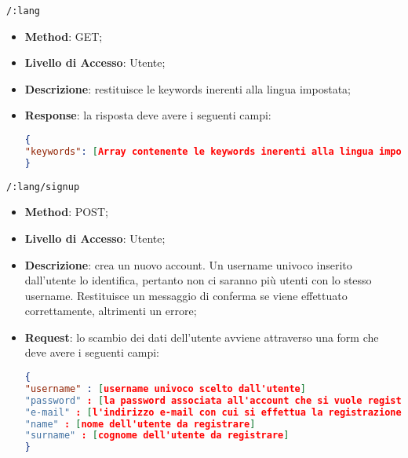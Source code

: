 	\item \texttt{/:lang}
		\begin{itemize}
			\item \textbf{Method}: GET;
			\item \textbf{Livello di Accesso}: Utente;
			\item \textbf{Descrizione}: restituisce le keywords inerenti alla lingua impostata;
			\item \textbf{Response}: la risposta deve avere i seguenti campi:
\begin{lstlisting}[language=json,firstnumber=1]
{
"keywords": [Array contenente le keywords inerenti alla lingua impostata ]
}
\end{lstlisting}
		\end{itemize}
	
	
	\item \texttt{/:lang/signup}
		\begin{itemize}
			\item \textbf{Method}: POST;
			\item \textbf{Livello di Accesso}: Utente;
			\item \textbf{Descrizione}: crea un nuovo account. Un username univoco inserito dall'utente lo identifica, pertanto non ci saranno più utenti con lo stesso username. Restituisce un messaggio di conferma se viene effettuato correttamente, altrimenti un errore;
			\item \textbf{Request}: lo scambio dei dati dell'utente avviene attraverso una form che deve avere i seguenti campi:
\begin{lstlisting}[language=json,firstnumber=1]
{
"username" : [username univoco scelto dall'utente]
"password" : [la password associata all'account che si vuole registrare]
"e-mail" : [l'indirizzo e-mail con cui si effettua la registrazione]
"name" : [nome dell'utente da registrare]
"surname" : [cognome dell'utente da registrare]
}
\end{lstlisting}
		\end{itemize}